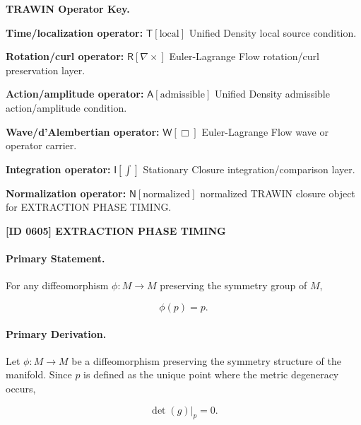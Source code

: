 \par\vspace{0.45\baselineskip}
\noindent\begin{minipage}[t]{\linewidth}
\begingroup
\small
\raggedright
\textbf{TRAWIN Operator Key.}\par
\noindent\textbf{Time/localization operator:} $\mathsf{T}\!\left[\mathrm{local}\right]$ Unified Density local source condition.\par
\noindent\textbf{Rotation/curl operator:} $\mathsf{R}\!\left[\nabla\times\right]$ Euler-Lagrange Flow rotation/curl preservation layer.\par
\noindent\textbf{Action/amplitude operator:} $\mathsf{A}\!\left[\mathrm{admissible}\right]$ Unified Density admissible action/amplitude condition.\par
\noindent\textbf{Wave/d'Alembertian operator:} $\mathsf{W}\!\left[\Box\right]$ Euler-Lagrange Flow wave or operator carrier.\par
\noindent\textbf{Integration operator:} $\mathsf{I}\!\left[\int\right]$ Stationary Closure integration/comparison layer.\par
\noindent\textbf{Normalization operator:} $\mathsf{N}\!\left[\mathrm{normalized}\right]$ normalized TRAWIN closure object for EXTRACTION PHASE TIMING.\par
\endgroup
\end{minipage}

\clearpage
\noindent\textbf{[ID 0605] EXTRACTION PHASE TIMING}\par
\vspace{0.35em}
\paragraph{Primary Statement.}
For any diffeomorphism $\phi:M\to M$ preserving the symmetry group of $M$,

\begin{equation}
\phi(p)=p .
\end{equation}

\paragraph{Primary Derivation.}
Let $\phi:M\to M$ be a diffeomorphism preserving the symmetry structure of the manifold. Since $p$ is defined as the unique point where the metric degeneracy occurs,

\begin{equation}
\det(g)\big|_p=0 .
\end{equation}

